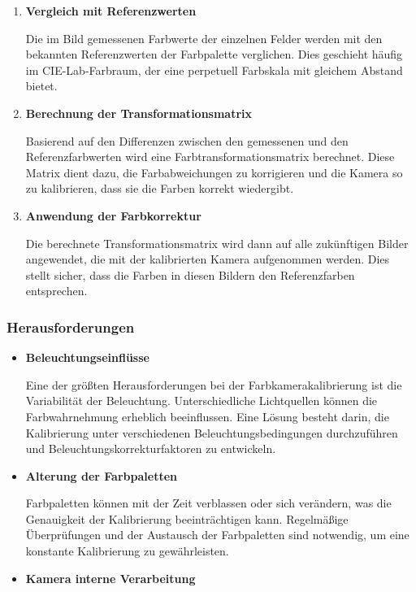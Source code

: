 {\begin{enumerate}
        Nach der Aufnahme werden die einzelnen Farbfelder in den Bildern identifiziert. Dies kann manuell oder automatisch erfolgen, wobei Algorithmen zur Mustererkennung verwendet werden, um die Positionen der Farbfelder zu bestimmen.
        \item \textbf{Vergleich mit Referenzwerten}
        
        Die im Bild gemessenen Farbwerte der einzelnen Felder werden mit den bekannten Referenzwerten der Farbpalette verglichen. Dies geschieht häufig im CIE-Lab-Farbraum, der eine perpetuell Farbskala mit gleichem Abstand bietet.
        \item \textbf{Berechnung der Transformationsmatrix}
        
        Basierend auf den Differenzen zwischen den gemessenen und den \\Referenzfarbwerten wird eine Farbtransformationsmatrix berechnet. Diese Matrix dient dazu, die Farbabweichungen zu korrigieren und die Kamera so zu kalibrieren, dass sie die Farben korrekt wiedergibt.
        \item \textbf{Anwendung der Farbkorrektur}
        
        Die berechnete Transformationsmatrix wird dann auf alle zukünftigen Bilder angewendet, die mit der kalibrierten Kamera aufgenommen werden. Dies stellt sicher, dass die Farben in diesen Bildern den Referenzfarben entsprechen.
        
    \end{enumerate}
    
    \subsubsection{Herausforderungen}
    \begin{itemize}
        \item \textbf{Beleuchtungseinflüsse}
        
        Eine der größten Herausforderungen bei der Farbkamerakalibrierung ist die Variabilität der Beleuchtung. Unterschiedliche Lichtquellen können die Farbwahrnehmung erheblich beeinflussen. Eine Lösung besteht darin, die Kalibrierung unter verschiedenen Beleuchtungsbedingungen durchzuführen und Beleuchtungskorrekturfaktoren zu entwickeln.
        \item \textbf{ Alterung der Farbpaletten}
        
        Farbpaletten können mit der Zeit verblassen oder sich verändern, was die Genauigkeit der Kalibrierung beeinträchtigen kann. Regelmäßige Überprüfungen und der Austausch der Farbpaletten sind notwendig, um eine konstante Kalibrierung zu gewährleisten.
        \item \textbf{Kamera interne Verarbeitung}
        

\end{itemize}}
